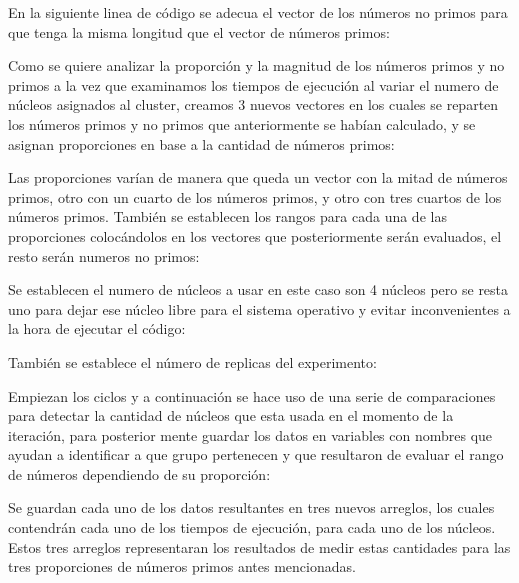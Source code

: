 \documentclass{article}
\begin{document}


En la siguiente linea de código se adecua el vector de los números no primos para que tenga la misma longitud que el vector de números primos:



Como se quiere analizar la proporción y la magnitud de los números primos y no primos a la vez que examinamos los tiempos de ejecución al variar el numero de núcleos asignados al cluster, creamos 3 nuevos vectores en los cuales se reparten los números primos y no primos que anteriormente se habían calculado, y se asignan proporciones en base a la cantidad de números primos:



Las proporciones varían de manera que queda un vector con la mitad de números primos, otro con un cuarto de los números primos, y otro con tres cuartos de los números primos.
También se establecen los rangos para cada una de las proporciones colocándolos en los vectores que posteriormente serán evaluados, el resto serán numeros no primos:



Se establecen el numero de núcleos a usar en este caso son 4 núcleos pero se resta uno para dejar ese núcleo libre para el sistema operativo y evitar inconvenientes a la hora de ejecutar el código:



También se establece el número de replicas del experimento:



Empiezan los ciclos y a continuación se hace uso de una serie de comparaciones para detectar la cantidad de núcleos que esta usada en el momento de la iteración, para posterior mente guardar los datos en variables con nombres que ayudan a identificar a que grupo pertenecen y que resultaron de evaluar el rango de números dependiendo de su proporción:



Se guardan cada uno de los datos resultantes en tres nuevos arreglos, los cuales contendrán cada uno de los tiempos de ejecución, para cada uno de los núcleos.
Estos tres arreglos representaran los resultados de medir estas cantidades para las tres proporciones de números primos antes mencionadas.
\end{document}
